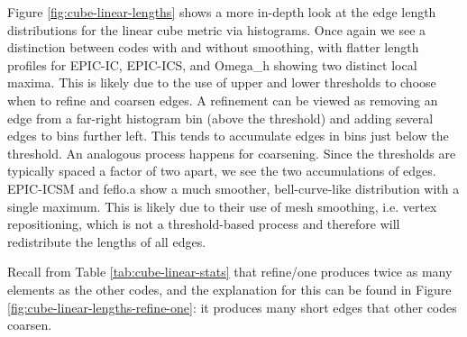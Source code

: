\documentclass[3p,times,procedia,number]{elsarticle}
\begin{document}
Figure \ref{fig:cube-linear-lengths} shows a more in-depth look
at the edge length distributions for the linear cube metric
via histograms.
Once again we see a distinction between codes with and without
smoothing, with flatter length profiles
for EPIC-IC, EPIC-ICS, and Omega\_h showing two distinct local maxima.
This is likely due to the use of upper and lower thresholds
to choose when to refine and coarsen edges.
A refinement can be viewed as removing an edge from a far-right
histogram bin (above the threshold) and adding several edges to bins further left.
This tends to accumulate edges in bins just below the threshold.
An analogous process happens for coarsening.
Since the thresholds are typically spaced a factor of two apart,
we see the two accumulations of edges.
EPIC-ICSM and feflo.a show a much smoother, bell-curve-like distribution
with a single maximum.
This is likely due to their use of mesh smoothing, i.e. vertex
repositioning, which is not a threshold-based process and therefore
will redistribute the lengths of all edges.

Recall from Table \ref{tab:cube-linear-stats} that  refine/one produces
twice as many elements as the other codes, and the explanation for this can be
found in Figure \ref{fig:cube-linear-lengths-refine-one}:
it produces many short edges that other codes coarsen.
\end{document}
